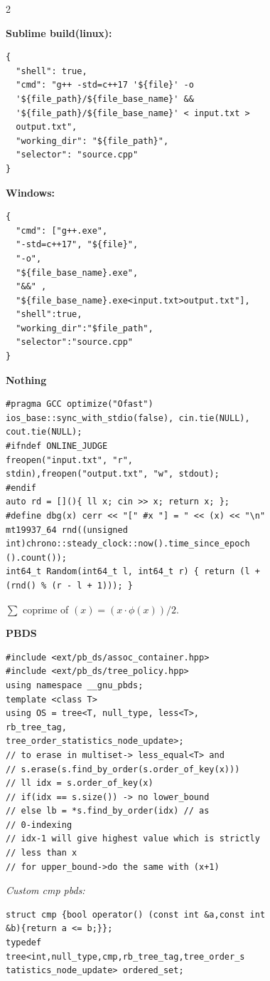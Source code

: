\documentclass[10pt,a4paper]{article}
\begin{document}
\begin{paracol}{2}

\textbf{\Large Sublime build(linux):}
\begin{lstlisting}
{
  "shell": true,
  "cmd": "g++ -std=c++17 '${file}' -o
  '${file_path}/${file_base_name}' &&
  '${file_path}/${file_base_name}' < input.txt >
  output.txt",
  "working_dir": "${file_path}",
  "selector": "source.cpp"
}
\end{lstlisting}

\textbf{Windows:}
\begin{lstlisting}
{
  "cmd": ["g++.exe",
  "-std=c++17", "${file}",
  "-o",
  "${file_base_name}.exe",
  "&&" ,
  "${file_base_name}.exe<input.txt>output.txt"],
  "shell":true,
  "working_dir":"$file_path",
  "selector":"source.cpp"
}
\end{lstlisting}

\textbf{Nothing}
\begin{lstlisting}
#pragma GCC optimize("Ofast")
ios_base::sync_with_stdio(false), cin.tie(NULL),
cout.tie(NULL);
#ifndef ONLINE_JUDGE
freopen("input.txt", "r",
stdin),freopen("output.txt", "w", stdout);
#endif
auto rd = [](){ ll x; cin >> x; return x; };
#define dbg(x) cerr << "[" #x "] = " << (x) << "\n"
mt19937_64 rnd((unsigned
int)chrono::steady_clock::now().time_since_epoch
().count());
int64_t Random(int64_t l, int64_t r) { return (l +
(rnd() % (r - l + 1))); }
\end{lstlisting}

$\sum$ coprime of $(x) = (x \cdot \phi(x))/2$.

\textbf{PBDS}
\begin{lstlisting}
#include <ext/pb_ds/assoc_container.hpp>
#include <ext/pb_ds/tree_policy.hpp>
using namespace __gnu_pbds;
template <class T>
using OS = tree<T, null_type, less<T>,
rb_tree_tag,
tree_order_statistics_node_update>;
// to erase in multiset-> less_equal<T> and
// s.erase(s.find_by_order(s.order_of_key(x)))
// ll idx = s.order_of_key(x)
// if(idx == s.size()) -> no lower_bound
// else lb = *s.find_by_order(idx) // as
// 0-indexing
// idx-1 will give highest value which is strictly
// less than x
// for upper_bound->do the same with (x+1)
\end{lstlisting}

\textit{Custom cmp pbds:}

\begin{lstlisting}
struct cmp {bool operator() (const int &a,const int
&b){return a <= b;}};
typedef
tree<int,null_type,cmp,rb_tree_tag,tree_order_s
tatistics_node_update> ordered_set;
\end{lstlisting}


\end{paracol}
\end{document}
